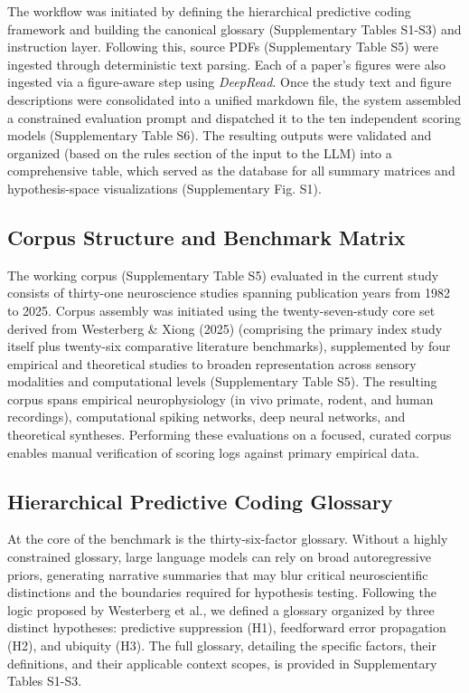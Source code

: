 \documentclass[12pt]{article}
\begin{document}
The workflow was initiated by defining the hierarchical predictive coding framework and building the canonical glossary (Supplementary Tables S1-S3) and instruction layer. Following this, source PDFs (Supplementary Table S5) were ingested through deterministic text parsing. Each of a paper's figures were also ingested via a figure-aware step using \emph{DeepRead}\cite{ref57}. Once the study text and figure descriptions were consolidated into a unified markdown file, the system assembled a constrained evaluation prompt and dispatched it to the ten independent scoring models (Supplementary Table S6). The resulting outputs were validated and organized (based on the rules section of the input to the LLM) into a comprehensive table, which served as the database for all summary matrices and hypothesis-space visualizations (Supplementary Fig. S1).

\subsection{Corpus Structure and Benchmark Matrix}\label{corpus-structure-and-benchmark-matrix}

The working corpus (Supplementary Table S5) evaluated in the current study consists of thirty-one neuroscience studies spanning publication years from 1982 to 2025. Corpus assembly was initiated using the twenty-seven-study core set derived from Westerberg \& Xiong (2025)\cite{ref34} (comprising the primary index study itself plus twenty-six comparative literature benchmarks), supplemented by four empirical and theoretical studies to broaden representation across sensory modalities and computational levels (Supplementary Table S5). The resulting corpus spans empirical neurophysiology (in vivo primate, rodent, and human recordings), computational spiking networks, deep neural networks, and theoretical syntheses. Performing these evaluations on a focused, curated corpus enables manual verification of scoring logs against primary empirical data.

\subsection{Hierarchical Predictive Coding Glossary}\label{hierarchical-predictive-coding-glossary}

At the core of the benchmark is the thirty-six-factor glossary. Without a highly constrained glossary, large language models can rely on broad autoregressive priors, generating narrative summaries that may blur critical neuroscientific distinctions and the boundaries required for hypothesis testing\cite{ref58}. Following the logic proposed by Westerberg et al.\cite{ref34}, we defined a glossary organized by three distinct hypotheses: predictive suppression (H1), feedforward error propagation (H2), and ubiquity (H3). The full glossary, detailing the specific factors, their definitions, and their applicable context scopes, is provided in Supplementary Tables S1-S3.
\end{document}
